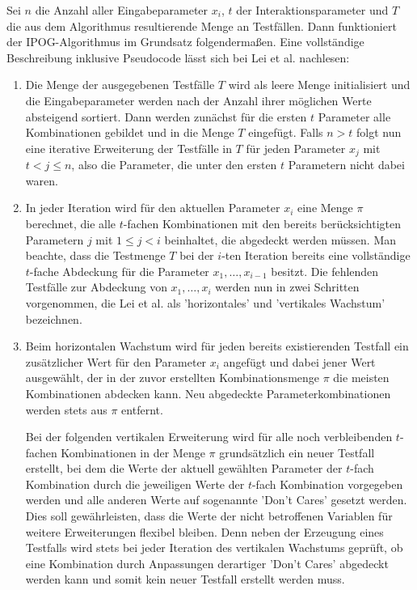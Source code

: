 Sei $n$ die Anzahl aller Eingabeparameter $x_i$, $t$ der Interaktionsparameter und $T$ die aus dem Algorithmus resultierende Menge an Testfällen. Dann funktioniert der IPOG-Algorithmus im Grundsatz folgendermaßen. Eine vollständige Beschreibung inklusive Pseudocode lässt sich bei Lei et al. \cite{lei2008ipog} nachlesen:
\begin{enumerate}
\item Die Menge der ausgegebenen Testfälle $T$ wird als leere Menge initialisiert und die Eingabeparameter werden nach der Anzahl ihrer möglichen Werte absteigend sortiert. Dann werden zunächst für die ersten $t$ Parameter alle Kombinationen gebildet und in die Menge $T$ eingefügt. Falls $n > t$ folgt nun eine iterative Erweiterung der Testfälle in $T$ für jeden Parameter $x_j$ mit $t < j \leq n$, also die Parameter, die unter den ersten $t$ Parametern nicht dabei waren.
\item In jeder Iteration wird für den aktuellen Parameter $x_i$ eine Menge $\pi$ berechnet, die alle $t$-fachen Kombinationen mit den bereits berücksichtigten Parametern $j$ mit $1 \leq j < i$ beinhaltet, die abgedeckt werden müssen. Man beachte, dass die Testmenge $T$ bei der $i$-ten Iteration bereits eine vollständige $t$-fache Abdeckung für die Parameter $x_1,\dots,x_{i-1}$ besitzt. Die fehlenden Testfälle zur Abdeckung von $x_1,\dots,x_i$ werden nun in zwei Schritten vorgenommen, die Lei et al. als 'horizontales' und 'vertikales Wachstum' \cite{lei2008ipog} bezeichnen.
\item Beim horizontalen Wachstum wird für jeden bereits existierenden Testfall ein zusätzlicher Wert für den Parameter $x_i$ angefügt und dabei jener Wert ausgewählt, der in der zuvor erstellten Kombinationsmenge $\pi$ die meisten Kombinationen abdecken kann. Neu abgedeckte Parameterkombinationen werden stets aus $\pi$ entfernt.

Bei der folgenden vertikalen Erweiterung wird für alle noch verbleibenden $t$-fachen Kombinationen in der Menge $\pi$ grundsätzlich ein neuer Testfall erstellt, bei dem die Werte der aktuell gewählten Parameter der $t$-fach Kombination durch die jeweiligen Werte der $t$-fach Kombination vorgegeben werden und alle anderen Werte auf sogenannte 'Don't Cares' gesetzt werden. Dies soll gewährleisten, dass die Werte der nicht betroffenen Variablen für weitere Erweiterungen flexibel bleiben. Denn neben der Erzeugung eines Testfalls wird stets bei jeder Iteration des vertikalen Wachstums geprüft, ob eine Kombination durch Anpassungen derartiger 'Don't Cares' abgedeckt werden kann und somit kein neuer Testfall erstellt werden muss.
\end{enumerate}

